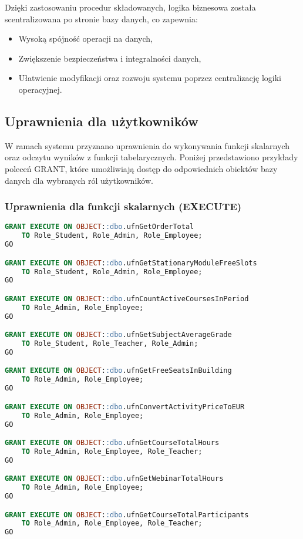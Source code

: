 \documentclass[12pt]{article}
\begin{document}
Dzięki zastosowaniu procedur składowanych, logika biznesowa została scentralizowana po stronie bazy danych, co zapewnia:
\begin{itemize}
    \item Wysoką spójność operacji na danych,
    \item Zwiększenie bezpieczeństwa i integralności danych,
    \item Ułatwienie modyfikacji oraz rozwoju systemu poprzez centralizację logiki operacyjnej.
\end{itemize}

\subsection{Uprawnienia dla użytkowników}

W ramach systemu przyznano uprawnienia do wykonywania funkcji skalar­nych oraz odczytu wyników z funkcji tabelarycznych. Poniżej przedstawiono przykłady poleceń GRANT, które umożliwiają dostęp do odpowiednich obiektów bazy danych dla wybranych ról użytkowników.

\subsubsection*{Uprawnienia dla funkcji skalar­nych (EXECUTE)}
\begin{lstlisting}[language=SQL]
GRANT EXECUTE ON OBJECT::dbo.ufnGetOrderTotal
    TO Role_Student, Role_Admin, Role_Employee;
GO

GRANT EXECUTE ON OBJECT::dbo.ufnGetStationaryModuleFreeSlots
    TO Role_Student, Role_Admin, Role_Employee;
GO

GRANT EXECUTE ON OBJECT::dbo.ufnCountActiveCoursesInPeriod
    TO Role_Admin, Role_Employee;
GO

GRANT EXECUTE ON OBJECT::dbo.ufnGetSubjectAverageGrade
    TO Role_Student, Role_Teacher, Role_Admin;
GO

GRANT EXECUTE ON OBJECT::dbo.ufnGetFreeSeatsInBuilding
    TO Role_Admin, Role_Employee;
GO

GRANT EXECUTE ON OBJECT::dbo.ufnConvertActivityPriceToEUR
    TO Role_Admin, Role_Employee;
GO

GRANT EXECUTE ON OBJECT::dbo.ufnGetCourseTotalHours
    TO Role_Admin, Role_Employee, Role_Teacher;
GO

GRANT EXECUTE ON OBJECT::dbo.ufnGetWebinarTotalHours
    TO Role_Admin, Role_Employee;
GO

GRANT EXECUTE ON OBJECT::dbo.ufnGetCourseTotalParticipants
    TO Role_Admin, Role_Employee, Role_Teacher;
GO
\end{lstlisting}
\newpage
\end{document}

